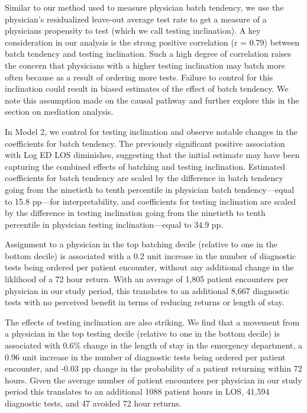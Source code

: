 \documentclass[,,nonblindrev]{informs}
\begin{document}
Similar to our method used to measure physician batch tendency, we use
the physician's residualized leave-out average test rate to get a
measure of a physicians propensity to test (which we call testing
inclination). A key consideration in our analysis is the strong positive
correlation (r = 0.79) between batch tendency and testing inclination.
Such a high degree of correlation raises the concern that physicians
with a higher testing inclination may batch more often because as a
result of ordering more tests. Failure to control for this inclination
could result in biased estimates of the effect of batch tendency. We
note this assumption made on the causal pathway and further explore this
in the section on mediation analysis.

In Model 2, we control for testing inclination and observe notable
changes in the coefficients for batch tendency. The previously
significant positive association with Log ED LOS diminishes, suggesting
that the initial estimate may have been capturing the combined effects
of batching and testing inclination. Estimated coefficients for batch
tendency are scaled by the difference in batch tendency going from the
ninetieth to tenth percentile in physician batch tendency---equal to
15.8 pp---for interpretability, and coefficients for testing inclination
are scaled by the difference in testing inclination going from the
ninetieth to tenth percentile in physician testing inclination---equal
to 34.9 pp.

Assignment to a physician in the top batching decile (relative to one in
the bottom decile) is associated with a 0.2 unit increase in the number
of diagnostic tests being ordered per patient encounter, without any
additional change in the liklihood of a 72 hour return. With an average
of 1,805 patient encounters per physician in our study period, this
translates to an additional 8,667 diagnostic tests with no perceived
benefit in terms of reducing returns or length of stay.

The effects of testing inclination are also striking. We find that a
movement from a physician in the top testing decile (relative to one in
the bottom decile) is associated with 0.6\% change in the length of stay
in the emergency department, a 0.96 unit increase in the number of
diagnostic tests being ordered per patient encounter, and -0.03 pp
change in the probability of a patient returning within 72 hours. Given
the average number of patient encounters per physician in our study
period this translates to an additional 1088 patient hours in LOS,
41,594 diagnostic tests, and 47 avoided 72 hour returns.
\end{document}
